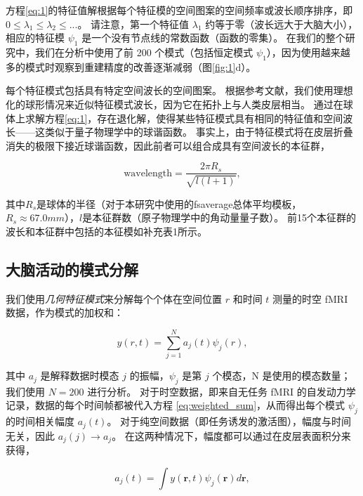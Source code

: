 \documentclass[lang=cn,a4paper,newtx]{elegantpaper}
\begin{document}
方程\ref{eq:1}的特征值解根据每个特征模的空间图案的空间频率或波长顺序排序，即$ 0 \leq \lambda_1 \leq \lambda_2 \leq ... $。
请注意，第一个特征值 $ \lambda_1 $ 约等于零（波长远大于大脑大小），相应的特征模 $ \psi_1 $ 是一个没有节点线的常数函数（函数的零集）。
在我们的整个研究中，我们在分析中使用了前 200 个模式（包括恒定模式 $ \psi_1 $），因为使用越来越多的模式时观察到重建精度的改善逐渐减弱（图\ref{fig:1}d）。


每个特征模式包括具有特定空间波长的空间图案。
根据参考文献\cite{robinson2016eigenmodes}，我们使用理想化的球形情况来近似特征模式波长，因为它在拓扑上与人类皮层相当。
通过在球体上求解方程\ref{eq:1}，存在退化解，使得某些特征模式具有相同的特征值和空间波长——这类似于量子物理学中的球谐函数。
事实上，由于特征模式将在皮层折叠消失的极限下接近球谐函数，因此前者可以组合成具有空间波长的本征群，

\begin{equation}
	\text{wavelength} = \frac{2 \pi R_s}{\sqrt{l(l+1)}},
\end{equation}

其中$R_s$是球体的半径（对于本研究中使用的fsaverage总体平均模板，$R_s \approx 67.0 mm$），$l$是本征群数（原子物理学中的角动量量子数）。
前15个本征群的波长和本征群中包括的本征模如补充表1所示。


\subsection{大脑活动的模式分解} \label{sec:modal_decomposition}

我们使用\textit{几何特征模式}来分解每个个体在空间位置 $ r $ 和时间 $ t $ 测量的时空 fMRI 数据，作为模式的加权和：

\begin{equation}\label{eq:weighted_sum}
	y(r, t) = \sum_{j=1}^{N} a_j(t) \psi_j(r),
\end{equation}

其中 $ a_j  $ 是解释数据时模态 $ j $ 的振幅，$ \psi_j $ 是第 $ j $ 个模态，N 是使用的模态数量；
我们使用 $ N = 200 $ 进行分析。
对于时空数据，即来自无任务 fMRI 的自发动力学记录，数据的每个时间帧都被代入方程 \ref{eq:weighted_sum}，从而得出每个模式 $ \psi_j $ 的时间相关幅度 $ a_j(t) $。
对于纯空间数据（即任务诱发的激活图），幅度与时间无关，因此 $ a_j(j) \rightarrow a_j $。
在这两种情况下，幅度都可以通过在皮层表面积分来获得，

\begin{equation}\label{eq:amplitudes}
	a_j(t) = \int y(\boldsymbol{r}, t) \psi_j(\boldsymbol{r}) d\boldsymbol{r}, 
\end{equation}
\end{document}
